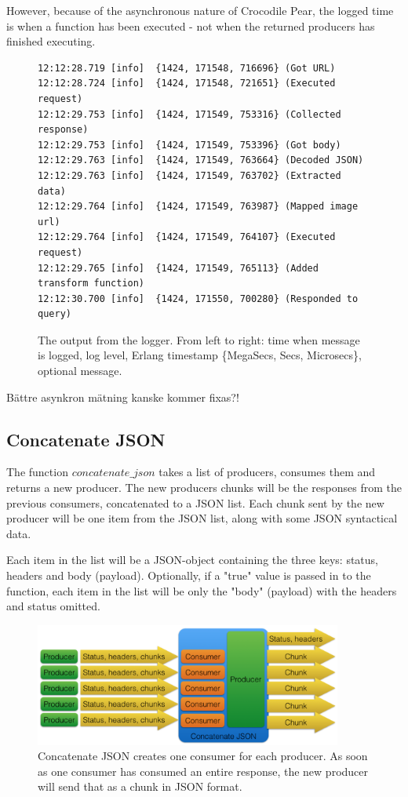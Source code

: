 \documentclass{cslthse-msc}
\begin{document}
However, because of the asynchronous nature of Crocodile Pear, the logged time is when a function has been executed - not when the returned producers has finished executing.

\begin{figure}[H]
  \centering
\begin{lstlisting}[breaklines=true,frame=single]
12:12:28.719 [info]  {1424, 171548, 716696} (Got URL)
12:12:28.724 [info]  {1424, 171548, 721651} (Executed request)
12:12:29.753 [info]  {1424, 171549, 753316} (Collected response)
12:12:29.753 [info]  {1424, 171549, 753396} (Got body)
12:12:29.763 [info]  {1424, 171549, 763664} (Decoded JSON)
12:12:29.763 [info]  {1424, 171549, 763702} (Extracted data)
12:12:29.764 [info]  {1424, 171549, 763987} (Mapped image url)
12:12:29.764 [info]  {1424, 171549, 764107} (Executed request)
12:12:29.765 [info]  {1424, 171549, 765113} (Added transform function)
12:12:30.700 [info]  {1424, 171550, 700280} (Responded to query)
\end{lstlisting}
  \caption{The output from the logger. From left to right: time when message is logged, log level, Erlang timestamp \{MegaSecs, Secs, Microsecs\}, optional message.}
\end{figure}

Bättre asynkron mätning kanske kommer fixas?!

\subsection{Concatenate JSON}
The function $concatenate\_json$ takes a list of producers, consumes them and returns a new producer. The new producers chunks will be the responses from the previous consumers, concatenated to a JSON list. Each chunk sent by the new producer will be one item from the JSON list, along with some JSON syntactical data.

Each item in the list will be a JSON-object containing the three keys: status, headers and body (payload). Optionally, if a "true" value is passed in to the function, each item in the list will be only the "body" (payload) with the headers and status omitted.


\begin{figure}[H]
  \centering
    \begin{center}
      \includegraphics[width=0.9\textwidth]{images/crocpear_concatenate_json.png}
    \end{center}
  \caption{Concatenate JSON creates one consumer for each producer. As soon as one consumer has consumed an entire response, the new producer will send that as a chunk in JSON format.}
\end{figure}
\end{document}
